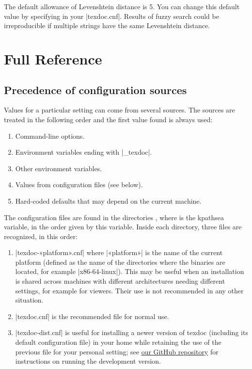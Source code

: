\documentclass[draft]{texdoc-doc}
\begin{document}
The default allowance of Levenshtein distance is 5. You can change this default
value by specifying  in your |texdoc.cnf|. Results of fuzzy
search could be irreproducible if multiple strings have the same Levenshtein
distance.

\clearpage

\section{Full Reference}

\subsection{Precedence of configuration sources}
\label{sec:prec}

Values for a particular setting can come from several sources. The sources are
treated in the following order and the first value found is always used:
%
\begin{enumerate}
\item Command-line options.
\item Environment variables ending with |_texdoc|.
\item Other environment variables.
\item Values from configuration files (see below).
\item Hard-coded defaults that may depend on the current machine.
\end{enumerate}

The configuration files are found in the directories , where
 is the kpathsea variable, in the order given by this variable.
Inside each directory, three files are recognized, in this order:
%
\begin{enumerate}
\item |texdoc-«platform».cnf| where |«platform»| is the name of the current
  platform (defined as the name of the directories where the {\TL}
  binaries are located, for example |x86-64-linux|). This may be useful when
  an installation is shared across machines with different architectures
  needing different settings, for example for viewers. Their use is not
  recommended in any other situation.
\item |texdoc.cnf| is the recommended file for normal use.
\item |texdoc-dist.cnf| is useful for installing a newer version of texdoc
  (including its default configuration file) in your home while retaining
  the use of the previous file for your personal setting; see
  \href{https://github.com/TeX-Live/texdoc}{our GitHub repository} for
  instructions on running the development version.
\end{enumerate}
\end{document}
